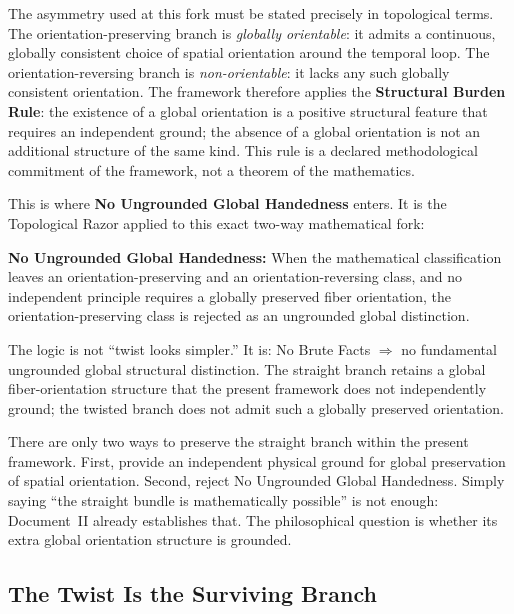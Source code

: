 \documentclass[11pt]{article}
\theoremstyle{canonstyle}
\begin{document}
The asymmetry used at this fork must be stated precisely in topological terms. The orientation-preserving branch is \emph{globally orientable}: it admits a continuous, globally consistent choice of spatial orientation around the temporal loop. The orientation-reversing branch is \emph{non-orientable}: it lacks any such globally consistent orientation. The framework therefore applies the \textbf{Structural Burden Rule}: the existence of a global orientation is a positive structural feature that requires an independent ground; the absence of a global orientation is not an additional structure of the same kind. This rule is a declared methodological commitment of the framework, not a theorem of the mathematics.

This is where \textbf{No Ungrounded Global Handedness} enters. It is the Topological Razor applied to this exact two-way mathematical fork:

\begin{keyresult}
\textbf{No Ungrounded Global Handedness:} When the mathematical classification leaves an orientation-preserving and an orientation-reversing class, and no independent principle requires a globally preserved fiber orientation, the orientation-preserving class is rejected as an ungrounded global distinction.
\end{keyresult}

The logic is not ``twist looks simpler.'' It is: No Brute Facts $\Longrightarrow$ no fundamental ungrounded global structural distinction. The straight branch retains a global fiber-orientation structure that the present framework does not independently ground; the twisted branch does not admit such a globally preserved orientation.

\begin{ifyoudisagree}
There are only two ways to preserve the straight branch within the present framework. First, provide an independent physical ground for global preservation of spatial orientation. Second, reject No Ungrounded Global Handedness. Simply saying ``the straight bundle is mathematically possible'' is not enough: Document~II already establishes that. The philosophical question is whether its extra global orientation structure is grounded.
\end{ifyoudisagree}

\subsection{The Twist Is the Surviving Branch}
\end{document}
